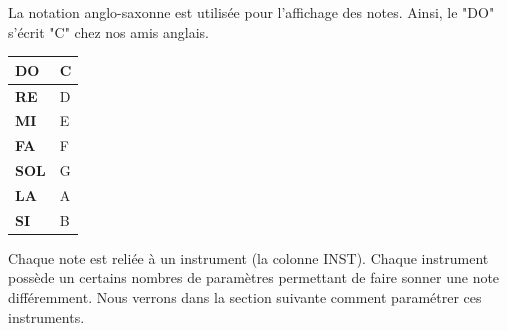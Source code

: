 \documentclass[12pt,a4paper]{article}
\begin{document}
    La notation anglo-saxonne est utilisée pour l'affichage des notes. Ainsi, le "DO" s'écrit "C" chez nos amis anglais.\medskip
    
        \begin{center}
            \tablelasttail{\hline}
            \begin{supertabular}{|l|l|}
            \hline
                {\bf DO} & C \\
                \hline
                {\bf RE} & D \\
                \hline
                {\bf MI} & E \\
                \hline
                {\bf FA} & F \\
                \hline
                {\bf SOL} & G \\
                \hline
                {\bf LA} & A \\
                \hline
                {\bf SI} & B \\
            \hline    
            \end{supertabular}
        \end{center}
    
    
    Chaque note est reliée à un instrument (la colonne INST). Chaque instrument possède un certains nombres de paramètres permettant de faire sonner une note différemment. Nous verrons dans la section suivante comment paramétrer ces instruments. 
    
    
\end{document}
